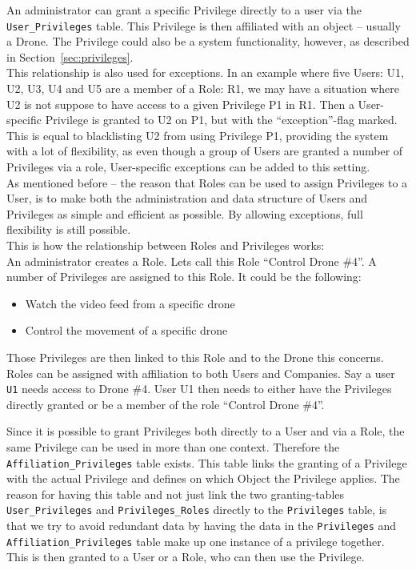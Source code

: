 An administrator can grant a specific Privilege directly to a user via the \verb+User_Privileges+ table.
This Privilege is then affiliated with an object -- usually a Drone.
The Privilege could also be a system functionality, however, as described in Section~\ref{sec:privileges}. \\

This relationship is also used for exceptions.
In an example where five Users: U1, U2, U3, U4 and U5 are a member of a Role: R1, we may have a situation where U2 is not suppose to have access to a given Privilege P1 in R1.
Then a User-specific Privilege is granted to U2 on P1, but with the ``exception''-flag marked.
This is equal to blacklisting U2 from using Privilege P1, providing the system with a lot of flexibility, as even though a group of Users are granted a number of Privileges via a role, User-specific exceptions can be added to this setting. \\


As mentioned before -- the reason that Roles can be used to assign Privileges to a User, is to make both the administration and data structure of Users and Privileges as simple and efficient as possible.
By allowing exceptions, full flexibility is still possible. \\

This is how the relationship between Roles and Privileges works: \\

An administrator creates a Role.
Lets call this Role ``Control Drone \#4''.
A number of Privileges are assigned to this Role.
It could be the following:

\begin{itemize}
    \item Watch the video feed from a specific drone
    \item Control the movement of a specific drone
\end{itemize}

Those Privileges are then linked to this Role and to the Drone this concerns. \\

Roles can be assigned with affiliation to both Users and Companies.
Say a user \verb+U1+ needs access to Drone \#4.
User U1 then needs to either have the Privileges directly granted or be a member of the role ``Control Drone \#4''.


Since it is possible to grant Privileges both directly to a User and via a Role, the same Privilege can be used in more than one context.
Therefore the \verb+Affiliation_Privileges+ table exists.
This table links the granting of a Privilege with the actual Privilege and defines on which Object the Privilege applies.
The reason for having this table and not just link the two granting-tables \verb+User_Privileges+ and \verb+Privileges_Roles+ directly to the \verb+Privileges+ table, is that we try to avoid redundant data by having the data in the \verb+Privileges+ and \verb+Affiliation_Privileges+ table make up one instance of a privilege together.
This is then granted to a User or a Role, who can then use the Privilege. \\

